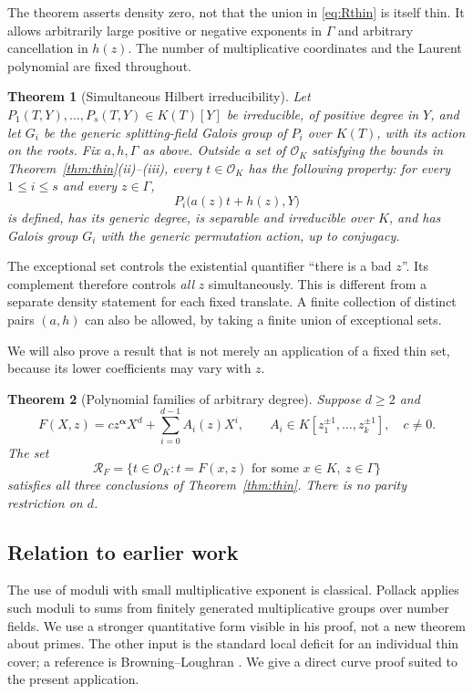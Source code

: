 \documentclass[11pt,a4paper]{article}
\newtheorem{theorem}{Theorem}[section]
\theoremstyle{definition}
\theoremstyle{remark}
\newcommand{\OK}{\mathcal O_K}
\newcommand{\cR}{\mathcal R}
\begin{document}
The theorem asserts density zero, not that the union in
\eqref{eq:Rthin} is itself thin. It allows arbitrarily large positive or
negative exponents in $\Gamma$ and arbitrary cancellation in $h(z)$.
The number of multiplicative coordinates and the Laurent polynomial are
fixed throughout.

\begin{theorem}[Simultaneous Hilbert irreducibility]\label{thm:HIT}
Let $P_1(T,Y),\ldots,P_s(T,Y)\in K(T)[Y]$ be irreducible, of positive
degree in $Y$, and let $G_i$ be the generic splitting-field Galois group
of $P_i$ over $K(T)$, with its action on the roots. Fix $a,h,\Gamma$ as
above. Outside a set of $\OK$ satisfying the bounds in
Theorem~\ref{thm:thin}(ii)--(iii), every $t\in\OK$ has the following
property: for every $1\le i\le s$ and every $z\in\Gamma$,
\[
 P_i\bigl(a(z)t+h(z),Y\bigr)
\]
is defined, has its generic degree, is separable and irreducible over
$K$, and has Galois group $G_i$ with the generic permutation action,
up to conjugacy.
\end{theorem}

The exceptional set controls the existential quantifier ``there is a bad
$z$''. Its complement therefore controls \emph{all} $z$ simultaneously.
This is different from a separate density statement for each fixed
translate. A finite collection of distinct pairs $(a,h)$ can also be
allowed, by taking a finite union of exceptional sets.

We will also prove a result that is not merely an application of a fixed
thin set, because its lower coefficients may vary with $z$.

\begin{theorem}[Polynomial families of arbitrary degree]\label{thm:polynomial}
Suppose $d\ge2$ and
\[
 F(X,z)=c z^{\boldsymbol\alpha}X^d+
                  \sum_{i=0}^{d-1} A_i(z)X^i,
 \qquad A_i\in K[z_1^{\pm1},\ldots,z_k^{\pm1}],\quad c\ne0.
\]
The set
\[
 \cR_F=\{t\in\OK:t=F(x,z)\text{ for some }x\in K,\ z\in\Gamma\}
\]
satisfies all three conclusions of Theorem~\ref{thm:thin}. There is no
parity restriction on $d$.
\end{theorem}

\subsection*{Relation to earlier work}
The use of moduli with small multiplicative exponent is classical.
Pollack \cite{Pollack} applies such moduli to sums from finitely generated
multiplicative groups over number fields. We use a stronger quantitative
form visible in his proof, not a new theorem about primes. The other
input is the standard local deficit for an individual thin cover; a
reference is Browning--Loughran \cite[Lemma~3.8(2)]{BL}. We give a direct
curve proof suited to the present application.
\end{document}
